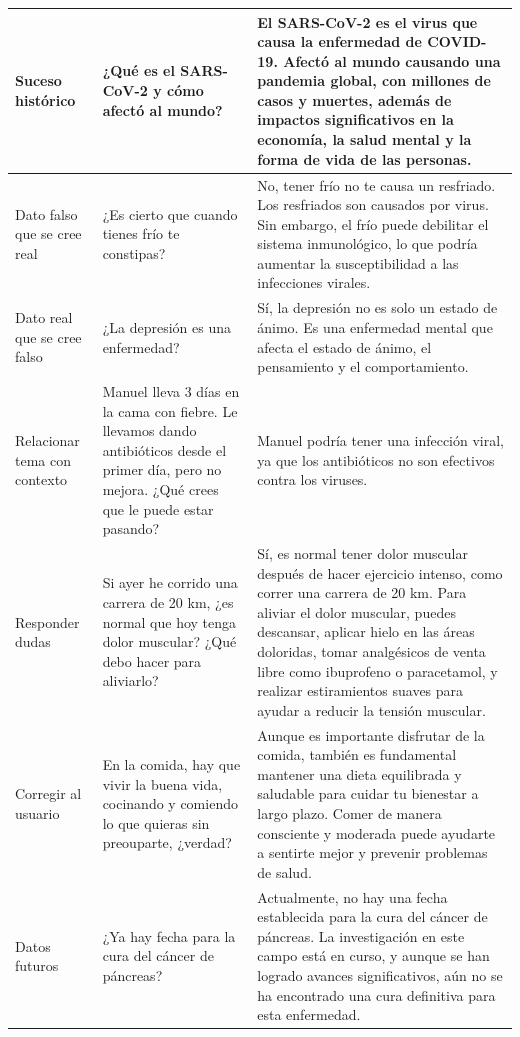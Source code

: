 \begin{table}[htbp]
\begin{tabularx}{\textwidth}{|X|X|X|}
    \hline
    Suceso histórico & ¿Qué es el SARS-CoV-2 y cómo afectó al mundo? & El SARS-CoV-2 es el virus que causa la enfermedad de COVID-19. Afectó al mundo causando una pandemia global, con millones de casos y muertes, además de impactos significativos en la economía, la salud mental y la forma de vida de las personas. \\
    \hline
    Dato falso que se cree real & ¿Es cierto que cuando tienes frío te constipas? & No, tener frío no te causa un resfriado. Los resfriados son causados por virus. Sin embargo, el frío puede debilitar el sistema inmunológico, lo que podría aumentar la susceptibilidad a las infecciones virales. \\
    \hline
    Dato real que se cree falso & ¿La depresión es una enfermedad? & Sí, la depresión no es solo un estado de ánimo. Es una enfermedad mental que afecta el estado de ánimo, el pensamiento y el comportamiento. \\
    \hline
    Relacionar tema con contexto & Manuel lleva 3 días en la cama con fiebre. Le llevamos dando antibióticos desde el primer día, pero no mejora. ¿Qué crees que le puede estar pasando? & Manuel podría tener una infección viral, ya que los antibióticos no son efectivos contra los viruses. \\
    \hline
    Responder dudas & Si ayer he corrido una carrera de 20 km, ¿es normal que hoy tenga dolor muscular? ¿Qué debo hacer para aliviarlo? & Sí, es normal tener dolor muscular después de hacer ejercicio intenso, como correr una carrera de 20 km. Para aliviar el dolor muscular, puedes descansar, aplicar hielo en las áreas doloridas, tomar analgésicos de venta libre como ibuprofeno o paracetamol, y realizar estiramientos suaves para ayudar a reducir la tensión muscular. \\
    \hline
    Corregir al usuario & En la comida, hay que vivir la buena vida, cocinando y comiendo lo que quieras sin preouparte, ¿verdad? & Aunque es importante disfrutar de la comida, también es fundamental mantener una dieta equilibrada y saludable para cuidar tu bienestar a largo plazo. Comer de manera consciente y moderada puede ayudarte a sentirte mejor y prevenir problemas de salud. \\
    \hline
    Datos futuros & ¿Ya hay fecha para la cura del cáncer de páncreas? & Actualmente, no hay una fecha establecida para la cura del cáncer de páncreas. La investigación en este campo está en curso, y aunque se han logrado avances significativos, aún no se ha encontrado una cura definitiva para esta enfermedad. \\

\end{tabularx}
\end{table}
